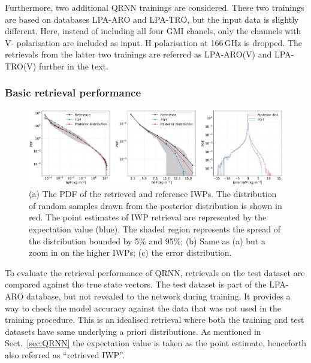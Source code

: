 \documentclass[amt, manuscript]{copernicus}
\begin{document}
Furthermore, two additional QRNN trainings are considered. These two trainings are based on databases LPA-ARO and LPA-TRO, but the input data is slightly different. Here, instead of including all four GMI chanels, only the channels with V- polarisation are included as input. H polarisation at 166\,GHz is dropped.  The retrievals from the latter two trainings are referred as LPA-ARO(V) and LPA-TRO(V) further in the text. 


\subsubsection{Basic retrieval performance}
%
\label{sec:basic_performance}

\begin{figure}[t]
	\includegraphics[width=12cm]{Figures/PDF_IWP_ARO.pdf}
	\caption{(a) The PDF of the retrieved and reference IWPs. The distribution of random samples drawn from the posterior distribution is shown in red. The point estimates of IWP retrieval are represented by the expectation value (blue). The shaded region represents the spread of the distribution bounded by 5\% and 95\%; (b) Same as (a) but a zoom in on the higher IWPs; (c) the error distribution. }
	\label{fig:PDF_IWP_test}
\end{figure}

To evaluate the  retrieval performance of QRNN, retrievals on the test dataset are compared against the true state vectors. The test dataset is part of the LPA-ARO database, but not revealed to the network during training. It provides a way to check the model accuracy against the data that was not used in the training procedure. This is an idealised retrieval where both the training and test datasets have same underlying a priori distributions. As mentioned in Sect.~\ref{sec:QRNN} the expectation value is taken as the point estimate, henceforth also referred as  ``retrieved IWP''.
\end{document}
